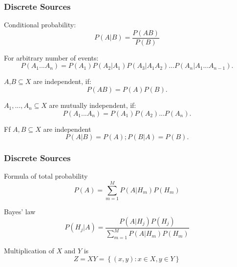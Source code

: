 \documentclass[14pt]{beamer}
\begin{document}
\begin{frame}
\frametitle{Discrete Sources}
\begin{itemize}
\small{  
    
    \item Conditional probability:
    \[
    P(A\vert B) = \frac{P(AB)}{P(B)}
    \]
    
    \item For arbitrary number of events:
    \[
    P(A_1 ...A_n ) = P(A_1 )P(A_2 \vert A_1 )P(A_3 \vert A_1 A_2 )...P(A_n \vert
    A_1 ...A_{n - 1} ).
    \]
    
    \item $A$,$B \subseteq X$ are independent, if:
    \[
    P(AB) = P(A)P(B).
    \]
    
    \item $A_1 ,...,A_n \subseteq X$ are mutually independent, if:
    \[
    P(A_1 ...A_n ) = P(A_1 )P(A_2 )...P(A_n ).
    \]
    
    \item Ff $A,B \subseteq X$ are independent
    \[
    P(A\vert B) = P(A);
    P(B\vert A) = P(B).
    \]
}

\end{itemize}
\end{frame}



\begin{frame}
\frametitle{Discrete Sources}
\begin{itemize}
\small{
    
    \item Formula of total probability
    \[
    P(A) = \sum\limits_{m = 1}^M {P(A\vert H_m )P(H_m )}
    \]
    
    \item Bayes’ law 
    \[
    P(H_j \vert A) = \frac{P(A\vert H_j )P(H_j )}{\sum\limits_{m = 1}^M {P(A\vert H_m )P(H_m )} }
    \]
    
    \item Multiplication of $X$ and $Y$ is
    \[
    Z = XY = \left\{ {(x,y):x \in X,y \in Y} \right\}
    \]
}
\end{itemize}
\end{frame}
\end{document}
